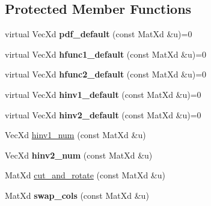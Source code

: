 \subsection*{Protected Member Functions}
\begin{DoxyCompactItemize}
\item 
virtual Vec\+Xd {\bfseries pdf\+\_\+default} (const Mat\+Xd \&u)=0\hypertarget{class_bicop_a89e76fb74a9a4583cd74ce7bd72b5821}{}\label{class_bicop_a89e76fb74a9a4583cd74ce7bd72b5821}

\item 
virtual Vec\+Xd {\bfseries hfunc1\+\_\+default} (const Mat\+Xd \&u)=0\hypertarget{class_bicop_a60b997ec055f573034fc1736470ed7db}{}\label{class_bicop_a60b997ec055f573034fc1736470ed7db}

\item 
virtual Vec\+Xd {\bfseries hfunc2\+\_\+default} (const Mat\+Xd \&u)=0\hypertarget{class_bicop_afb7f326409f22b6b65e46f89dcf5ee1a}{}\label{class_bicop_afb7f326409f22b6b65e46f89dcf5ee1a}

\item 
virtual Vec\+Xd {\bfseries hinv1\+\_\+default} (const Mat\+Xd \&u)=0\hypertarget{class_bicop_a401bdcb4172c55b3d5f0c2a0db30ca43}{}\label{class_bicop_a401bdcb4172c55b3d5f0c2a0db30ca43}

\item 
virtual Vec\+Xd {\bfseries hinv2\+\_\+default} (const Mat\+Xd \&u)=0\hypertarget{class_bicop_a046b0fdc43eed27002f0b7c3bc9a9ddb}{}\label{class_bicop_a046b0fdc43eed27002f0b7c3bc9a9ddb}

\item 
Vec\+Xd \hyperlink{class_bicop_abd517becaa97834eac56b0d1a0c7a666}{hinv1\+\_\+num} (const Mat\+Xd \&u)
\item 
Vec\+Xd {\bfseries hinv2\+\_\+num} (const Mat\+Xd \&u)\hypertarget{class_bicop_a2b262e9e2adee0c215da47467f1dec45}{}\label{class_bicop_a2b262e9e2adee0c215da47467f1dec45}

\item 
Mat\+Xd \hyperlink{class_bicop_a48dc314b01b0c5b0adb307d27d4dd53e}{cut\+\_\+and\+\_\+rotate} (const Mat\+Xd \&u)
\item 
Mat\+Xd {\bfseries swap\+\_\+cols} (const Mat\+Xd \&u)\hypertarget{class_bicop_a96e06c8996e378d56d9e87ff4d1a24ac}{}\label{class_bicop_a96e06c8996e378d56d9e87ff4d1a24ac}

\end{DoxyCompactItemize}
